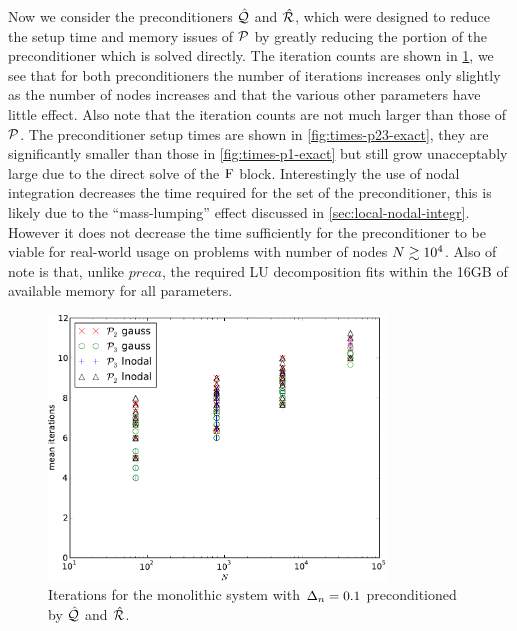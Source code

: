 Now we consider the preconditioners $\hat{\mathcal{Q}}$ and $\hat{\mathcal{R}}$, which were designed to reduce the setup time and memory issues of $\mathcal{P}$ by greatly reducing the portion of the preconditioner which is solved directly.
The iteration counts are shown in \cref{fig:its-p23-exact}, we see that for both preconditioners the number of iterations increases only slightly as the number of nodes increases and that the various other parameters have little effect.
Also note that the iteration counts are not much larger than those of $\mathcal{P}$.
The preconditioner setup times are shown in \cref{fig:times-p23-exact}, they are significantly smaller than those in \cref{fig:times-p1-exact} but still grow unacceptably large due to the direct solve of the $\mathrm{F}$ block.
Interestingly the use of nodal integration decreases the time required for the set of the preconditioner, this is likely due to the ``mass-lumping'' effect discussed in \cref{sec:local-nodal-integr}.
However it does not decrease the time sufficiently for the preconditioner to be viable for real-world usage on problems with number of nodes $N \gtrsim 10^4$.
Also of note is that, unlike $preca$, the required LU decomposition fits within the 16GB of available memory for all parameters.

\begin{figure}
  \centering
  \includegraphics[width=0.8\textwidth]{plots/linear_solvers_p2p3/implicitexact-meanofnsolveritersvsinitialnnode.pdf}
  \caption{Iterations for the monolithic system with $\Delta_{n}=0.1$ preconditioned by $\hat{\mathcal{Q}}$ and $\hat{\mathcal{R}}$.}
  \label{fig:its-p23-exact}
\end{figure}

